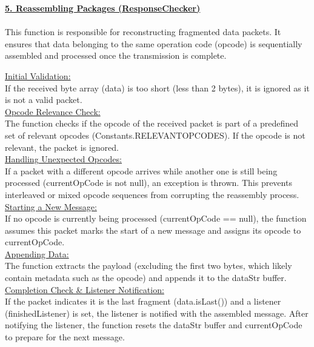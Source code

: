 {{	\underline{\textbf{5. Reassembling Packages (ResponseChecker)}}\mbox{}\\
	\\
	This function is responsible for reconstructing fragmented data packets. It ensures that data belonging to the same operation code (opcode) is sequentially assembled and processed once the transmission is complete.
	

	
	\underline{Initial Validation:}\mbox{}\\
	If the received byte array (data) is too short (less than 2 bytes), it is ignored as it is not a valid packet.
	\mbox{}\\
	\underline{Opcode Relevance Check:}\mbox{}\\
	The function checks if the opcode of the received packet is part of a predefined set of relevant opcodes (Constants.RELEVANT\textunderscore OPCODES).
	If the opcode is not relevant, the packet is ignored.
	\mbox{}\\
	\underline{Handling Unexpected Opcodes:}\mbox{}\\
	If a packet with a different opcode arrives while another one is still being processed (currentOpCode is not null), an exception is thrown. This prevents interleaved or mixed opcode sequences from corrupting the reassembly process.
	\mbox{}\\
	\underline{	Starting a New Message:}\mbox{}\\
	If no opcode is currently being processed (currentOpCode == null), the function assumes this packet marks the start of a new message and assigns its opcode to currentOpCode.
	\mbox{}\\
	\underline{Appending Data:}\mbox{}\\
	The function extracts the payload (excluding the first two bytes, which likely contain metadata such as the opcode) and appends it to the dataStr buffer.
	\mbox{}\\
	\underline{Completion Check \& Listener Notification:}\mbox{}\\
	If the packet indicates it is the last fragment (data.isLast()) and a listener (finishedListener) is set, the listener is notified with the assembled message.
	After notifying the listener, the function resets the dataStr buffer and currentOpCode to prepare for the next message.
	\mbox{}\\
	\mbox{}\\
	\mbox{}\\\\
}}
